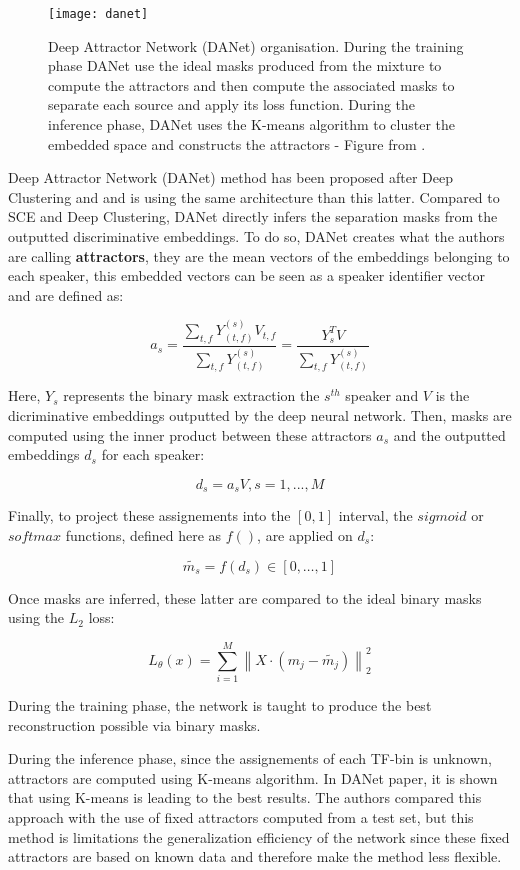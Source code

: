 \documentclass[master, tikz, final,11pt, dvipdfmx]{iscs-thesis}
\newcommand{\norm}[1]{\left\lVert#1\right\rVert}
\begin{document}
\begin{figure}[ht]
\centering
\texttt{[image: danet]}
\caption[Deep Attractor Network Architecture]{ Deep Attractor Network (DANet) organisation. During the training phase DANet use the ideal masks produced from the mixture to compute the attractors and then compute the associated masks to separate each source and apply its loss function. During the inference phase, DANet uses the K-means algorithm to cluster the embedded space and constructs the attractors - Figure from \cite{DANet}.}
\label{fig:danet}
\end{figure}

Deep Attractor Network (DANet) \cite{DANet} method has been proposed 
after Deep Clustering and and is using the same architecture than this latter. Compared to SCE and Deep Clustering, DANet directly infers the separation masks from the outputted discriminative embeddings. To do so, DANet creates what the authors are calling \textbf{attractors}, they are the mean vectors of the embeddings belonging to each speaker, this embedded vectors can be seen as a speaker identifier vector and are defined as:

\[a_s = \frac{\sum_{t,f}{Y_{(t,f)}^{(s)}V_{t,f} }}{\sum_{t,f}{Y_{(t,f)}^{(s)}}} = \frac{{Y_s^TV}}{\sum_{t,f}{Y_{(t,f)}^{(s)}}}\]

Here, $Y_s$ represents the binary mask extraction the $s^{th}$ speaker and $V$ is the dicriminative embeddings outputted by the deep neural network.
Then, masks are computed using the inner product between these attractors $a_s$ and the outputted embeddings $d_s$ for each speaker:

\[d_s = a_sV, s = 1,..., M \]

Finally, to project these assignements into the $[0, 1]$ interval, the $sigmoid$ or $softmax$ functions, defined here as $f()$, are applied on $d_s$:

\[\tilde{m_s} = f(d_s) \in [0,\dots,1] \]

Once masks are inferred, these latter are compared to the ideal binary masks using the $L_2$ loss:

\[L_\theta(x) = \sum_{i=1}^{M} \norm{X \cdot (m_j - \tilde{m_j})}^2_2 \]

During the training phase, the network is taught to produce the best reconstruction possible via binary masks. 

During the inference phase, since the assignements of each TF-bin is unknown, attractors are computed using K-means algorithm. In DANet paper, it is shown that using K-means is leading to the best results. The authors compared this approach with the use of fixed attractors computed from a test set, but this method is limitations the generalization efficiency of the network since these fixed attractors are based on known data and therefore make the method less flexible.
\end{document}
